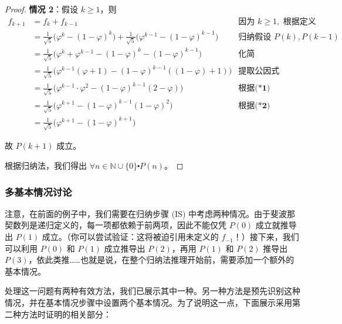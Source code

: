 \begin{example}[斐波那契数列的封闭形式]
\begin{proof}
        \textbf{情况 2}：假设 $k \ge 1$，则
        \begin{align*}
            f_{k+1} &= f_k+f_{k-1} & \text{因为 } k \ge 1, \textbf{ 根据定义} \\
            &= \frac{1}{\sqrt{5}}\big(\varphi^k-(1-\varphi)^k\big) + \frac{1}{\sqrt{5}}\big(\varphi^{k-1}-(1-\varphi)^{k-1}\big) & \text{归纳假设 } P(k), P(k-1)\\
            &= \frac{1}{\sqrt{5}}\big(\varphi^k+\varphi^{k-1}-(1-\varphi)^k-(1-\varphi)^{k-1}\big) & \textbf{化简}\\
            &= \frac{1}{\sqrt{5}}\big(\varphi^{k-1}(\varphi+1)-(1-\varphi)^{k-1}((1-\varphi)+1)\big) & \textbf{提取公因式}\\
            &= \frac{1}{\sqrt{5}}\big(\varphi^{k-1} \cdot \varphi^2-(1-\varphi)^{k-1}(2-\varphi)\big) & \textbf{根据(*1)}\\
            &= \frac{1}{\sqrt{5}}\big(\varphi^{k+1} -(1-\varphi)^{k-1}(1-\varphi)^2\big) & \textbf{根据(*2)}\\
            &= \frac{1}{\sqrt{5}}\big(\varphi^{k+1} -(1-\varphi)^{k+1}\big) & 
        \end{align*}

        故 $P(k+1)$ 成立。

        根据归纳法，我们得出 $\forall n \in \mathbb{N} \cup \{0\} \centerdot P(n)$。
    \end{proof}
\end{example}

\subsubsection*{多基本情况讨论}

注意，在前面的例子中，我们需要在归纳步骤 (IS) 中考虑两种情况。由于斐波那契数列是递归定义的，每一项都依赖于前两项，因此不能仅凭 $P(0)$ 成立就推导出 $P(1)$ 成立。（你可以尝试验证：这将被迫引用未定义的 $f_{-1}$！）接下来，我们可以利用 $P(0)$ 和 $P(1)$ 成立推导出 $P(2)$，再用 $P(1)$ 和 $P(2)$ 推导出 $P(3)$，依此类推……也就是说，在整个归纳法推理开始前，需要添加一个额外的基本情况。

处理这一问题有两种有效方法，我们已展示其中一种。另一种方法是预先识别这种情况，并在基本情况步骤中设置两个基本情况。为了说明这一点，下面展示采用第二种方法时证明的相关部分：

